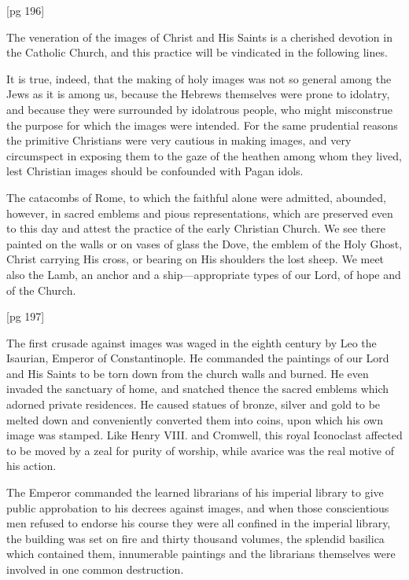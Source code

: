 [pg 196]


The veneration of the images of Christ and
His Saints is a cherished devotion in the
Catholic Church, and this practice will be
vindicated in the following lines.

It is true, indeed, that the making of holy images
was not so general among the Jews as it is
among us, because the Hebrews themselves were
prone to idolatry, and because they were surrounded
by idolatrous people, who might misconstrue
the purpose for which the images were intended.
For the same prudential reasons the
primitive Christians were very cautious in making
images, and very circumspect in exposing
them to the gaze of the heathen among whom
they lived, lest Christian images should be confounded
with Pagan idols.

The catacombs of Rome, to which the faithful
alone were admitted, abounded, however, in sacred
emblems and pious representations, which are
preserved even to this day and attest the practice
of the early Christian Church. We see there
painted on the walls or on vases of glass the
Dove, the emblem of the Holy Ghost, Christ carrying
His cross, or bearing on His shoulders the
lost sheep. We meet also the Lamb, an anchor
and a ship—appropriate types of our Lord, of
hope and of the Church.

[pg 197]

The first crusade against images was waged in
the eighth century by Leo the Isaurian, Emperor
of Constantinople. He commanded the paintings
of our Lord and His Saints to be torn down from
the church walls and burned. He even invaded
the sanctuary of home, and snatched thence the
sacred emblems which adorned private residences.
He caused statues of bronze, silver and gold to
be melted down and conveniently converted them
into coins, upon which his own image was
stamped. Like Henry VIII. and Cromwell, this
royal Iconoclast affected to be moved by a zeal
for purity of worship, while avarice was the real
motive of his action.

The Emperor commanded the learned librarians
of his imperial library to give public approbation
to his decrees against images, and when
those conscientious men refused to endorse his
course they were all confined in the imperial library,
the building was set on fire and thirty
thousand volumes, the splendid basilica which
contained them, innumerable paintings and the
librarians themselves were involved in one common
destruction.

